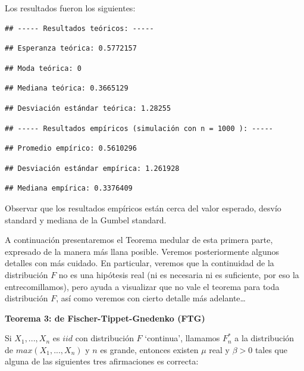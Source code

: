 \documentclass[
  20pt,
]{book}
\theoremstyle{definition}
\theoremstyle{definition}
\theoremstyle{definition}
\theoremstyle{definition}
\theoremstyle{remark}
\begin{document}
Los resultados fueron los siguientes:

\begin{verbatim}
## ----- Resultados teóricos: -----
\end{verbatim}

\begin{verbatim}
## Esperanza teórica: 0.5772157
\end{verbatim}

\begin{verbatim}
## Moda teórica: 0
\end{verbatim}

\begin{verbatim}
## Mediana teórica: 0.3665129
\end{verbatim}

\begin{verbatim}
## Desviación estándar teórica: 1.28255
\end{verbatim}

\begin{verbatim}
## ----- Resultados empíricos (simulación con n = 1000 ): -----
\end{verbatim}

\begin{verbatim}
## Promedio empírico: 0.5610296
\end{verbatim}

\begin{verbatim}
## Desviación estándar empírica: 1.261928
\end{verbatim}

\begin{verbatim}
## Mediana empírica: 0.3376409
\end{verbatim}

Observar que los resultados empíricos están cerca del valor esperado, desvío standard y mediana de la Gumbel standard.

A continuación presentaremos el Teorema medular de esta primera parte, expresado de la manera más llana posible. Veremos posteriormente algunos detalles con más cuidado. En particular, veremos que la continuidad de la distribución \(F\) no
es una hipótesis real (ni es necesaria ni es suficiente, por eso la
entrecomillamos), pero ayuda a visualizar que no vale el teorema para toda distribución \(F\), así como veremos con cierto detalle más adelante\ldots{}

\textbf{Teorema 3: de Fischer-Tippet-Gnedenko (FTG)}

Si \(X_1,...,X_n\) es \(iid\) con distribución \(F\) `continua',
llamamos \(F^{\ast}_n\) a la distribución de \(max(X_1,...,X_n)\) y \(n\)
es grande, entonces existen \(\mu\) real y \(\beta > 0\) tales que
alguna de las siguientes tres afirmaciones es
correcta:
\end{document}
